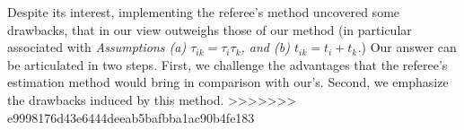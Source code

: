 \documentclass[a4paper,11pt]{article}
\begin{document}
Despite its interest, implementing the referee's method uncovered some drawbacks, that in our view outweighs those of our method (in particular associated with \textit{Assumptions (a) $\tau_{ik} = \tau_i\tau_{k}$, and (b) $t_{ik} = t_i+ t_{k}$.}) Our answer can be articulated in two steps. First, we challenge the advantages that the referee's estimation method would bring in comparison with our's. Second, we emphasize the drawbacks induced by this method. \smallskip
>>>>>>> e9998176d43e6444deeab5bafbba1ac90b4fe183
%
%
%
%
%
%
\end{document}
